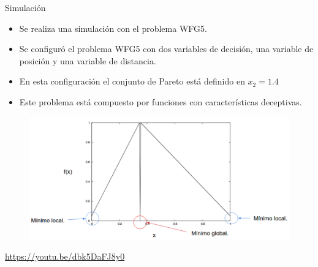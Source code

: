 \documentclass{beamer}
\newcommand{\HV}{{\sc hv}}
\begin{document}
\begin{frame}{Simulación}
\begin{itemize}
\scriptsize
\justifying
\item Se realiza una simulación con el problema WFG5.
\item Se configuró el problema WFG5 con dos variables de decisión, una variable de posición y una variable de distancia.
\item En esta configuración el conjunto de Pareto está definido en $x_2 = 1.4$
\item Este problema está compuesto por funciones con características deceptivas.
\end{itemize}
\begin{figure}[t]
\centering
\includegraphics[scale=0.2]{deceptiva_wfg5.png} \\
\end{figure}
\centering
\url{https://youtu.be/dbk5DaFJ8y0}
\end{frame}
\end{document}
